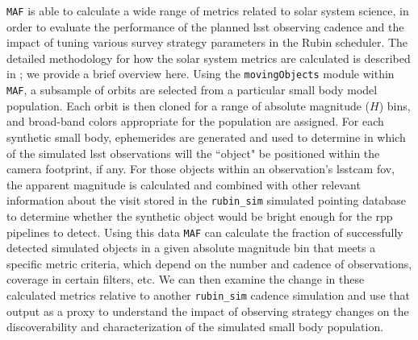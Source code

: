 \documentclass[preprintm,linenumbers]{aastex631}
\newcommand{\rubinsim}{\texttt{rubin\_sim}\xspace}
\newcommand{\maf}{\texttt{MAF}\xspace}
\begin{document}
\maf is able to calculate a wide range of metrics related to solar system science, in order to evaluate the performance of the planned \gls*{lsst} observing cadence and the impact of tuning various survey strategy parameters in the Rubin scheduler. The detailed methodology for how the solar system metrics are calculated is described in \cite{schwambTuningLegacySurvey2023}; we provide a brief overview here. 
Using the \texttt{movingObjects} module within \maf, a subsample of orbits are selected from a particular small body model population. 
Each orbit is then cloned for a range of absolute magnitude ($H$) bins, and broad-band colors appropriate for the population are assigned. 
For each synthetic small body, ephemerides are generated and used to determine in which of the simulated \gls*{lsst} observations will the ``object" be positioned within the camera footprint, if any. 
For those objects within an observation's \gls*{lsstcam} \gls*{fov}, the apparent magnitude is calculated and combined with other relevant information about the visit stored in the \rubinsim simulated pointing database to determine whether the synthetic object would be bright enough for the \gls*{rpp} pipelines to detect. 
Using this data \maf can calculate the fraction of successfully detected simulated objects in a given absolute magnitude bin that meets a specific metric criteria, which depend on the number and cadence of observations, coverage in certain filters, etc. 
We can then examine the change in these calculated metrics relative to another \rubinsim cadence simulation and use that output as a proxy to understand the impact of observing strategy changes on the discoverability and characterization of the simulated small body population.  
\end{document}
